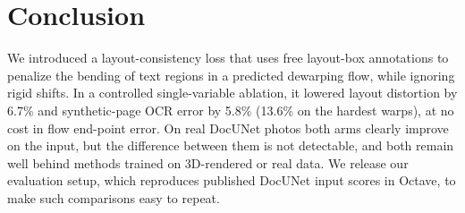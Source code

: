 \documentclass[conference]{IEEEtran}
\begin{document}
\section{Conclusion}
We introduced a layout-consistency loss that uses free layout-box annotations to penalize the bending of text regions in a predicted dewarping flow, while ignoring rigid shifts. In a controlled single-variable ablation, it lowered layout distortion by 6.7\% and synthetic-page OCR error by 5.8\% (13.6\% on the hardest warps), at no cost in flow end-point error. On real DocUNet photos both arms clearly improve on the input, but the difference between them is not detectable, and both remain well behind methods trained on 3D-rendered or real data. We release our evaluation setup, which reproduces published DocUNet input scores in Octave, to make such comparisons easy to repeat.



\end{document}
